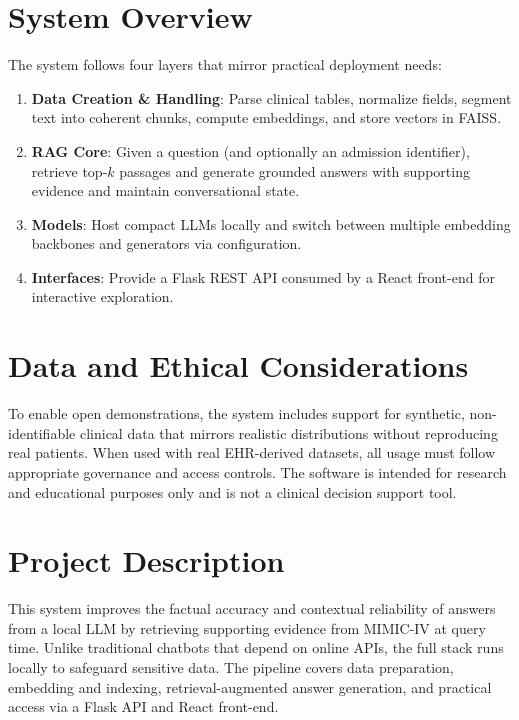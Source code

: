 \section{System Overview}
The system follows four layers that mirror practical deployment needs:
\begin{enumerate}
  \item \textbf{Data Creation \& Handling}: Parse clinical tables, normalize fields, segment text into coherent chunks, compute embeddings, and store vectors in FAISS.
  \item \textbf{RAG Core}: Given a question (and optionally an admission identifier), retrieve top-$k$ passages and generate grounded answers with supporting evidence and maintain conversational state.
  \item \textbf{Models}: Host compact LLMs locally and switch between multiple embedding backbones and generators via configuration.
  \item \textbf{Interfaces}: Provide a Flask REST API consumed by a React front-end for interactive exploration.
\end{enumerate}

\section{Data and Ethical Considerations}
To enable open demonstrations, the system includes support for synthetic, non-identifiable clinical data that mirrors realistic distributions without reproducing real patients. When used with real EHR-derived datasets, all usage must follow appropriate governance and access controls. The software is intended for research and educational purposes only and is not a clinical decision support tool.

\section{Project Description}
This system improves the factual accuracy and contextual reliability of answers from a local LLM by retrieving supporting evidence from MIMIC-IV at query time. Unlike traditional chatbots that depend on online APIs, the full stack runs locally to safeguard sensitive data. The pipeline covers data preparation, embedding and indexing, retrieval-augmented answer generation, and practical access via a Flask API and React front-end.

